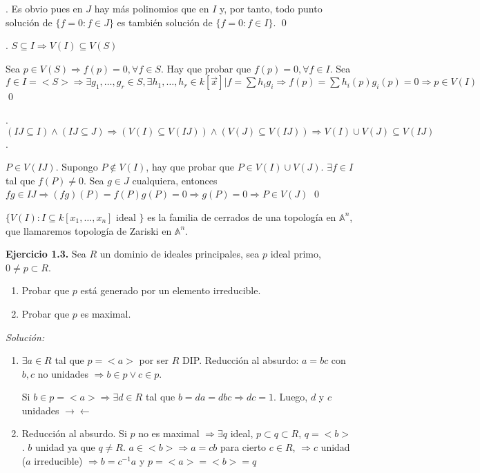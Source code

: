 \begin{Dem}

. Es obvio pues en $J$ hay más polinomios que en $I$ y, por tanto, todo punto solución de $\{ f=0 : f\in J \}$ es también solución de $\{ f = 0: f \in I \}$. \qed

. $S\subseteq I \Rightarrow V(I) \subseteq V(S)$

\framebox{$\supseteq $} Sea $p\in V(S) \Rightarrow f(p) = 0, \forall f\in S$. Hay que probar que $f(p)=0, \forall f \in I$.
Sea $f\in I=<S> \Rightarrow \exists g_1,\dots, g_r \in S, \exists h_1,\dots , h_r \in k[\vec{x}] | f=\sum h_i g_i \Rightarrow f(p)=\sum h_i(p)g_i(p) = 0 \Rightarrow p\in V(I)$ \qed

. $(IJ \subseteq I) \wedge (IJ\subseteq J) \Rightarrow (V(I)\subseteq V(IJ))\wedge (V(J)\subseteq V(IJ)) \Rightarrow V(I)\cup V(J) \subseteq V(IJ)$.

\framebox{$\supseteq$} $P\in V(IJ)$. Supongo $P\notin V(I)$, hay que probar que $P\in V(I)\cup V(J)$. $\exists f\in I$ tal que $f(P)\neq 0$. Sea $g\in J$ cualquiera, entonces $fg \in IJ \Rightarrow (fg)(P)=f(P)g(P)=0 \Rightarrow g(P) =0 \Rightarrow P\in V(J)$ \qed 
\end{Dem}

\begin{Cor}
$\{ V(I) : I\subseteq k[x_1,\dots ,x_n] \text { ideal } \}$ es la familia de cerrados de una topología en $\mathbb{A}^n$, que llamaremos topología de Zariski en $\mathbb{A}^n$.
\end{Cor}

\textbf{Ejercicio 1.3. } Sea $R$ un dominio de ideales principales, sea $p$ ideal primo, $0\neq p \subset R$.
\begin{enumerate}
\item Probar que $p$ está generado por un elemento irreducible.
\item Probar que $p$ es maximal.
\end{enumerate} 

\textit{Solución:}
\begin{enumerate}
\item $\exists a \in R$ tal que $p=<a>$ por ser $R$ DIP. Reducción al absurdo: $a=bc$ con $b,c$ no unidades $\Rightarrow b\in p \vee c \in p$.

Si $b\in p = <a> \Rightarrow \exists d \in R$ tal que $b=da=dbc \Rightarrow dc=1$. Luego, $d$ y $c$ unidades $\rightarrow \leftarrow $

\item Reducción al absurdo. Si $p$ no es maximal $\Rightarrow \exists q$ ideal, $p\subset q \subset R$, $q=<b>$. $b$ unidad ya que $q\neq R$. $a\in <b> \Rightarrow a=cb$ para cierto $c\in R$, $\Rightarrow c$ unidad ($a$ irreducible) $\Rightarrow b=c^{-1}a$ y $p=<a>=<b>=q$
\end{enumerate}

